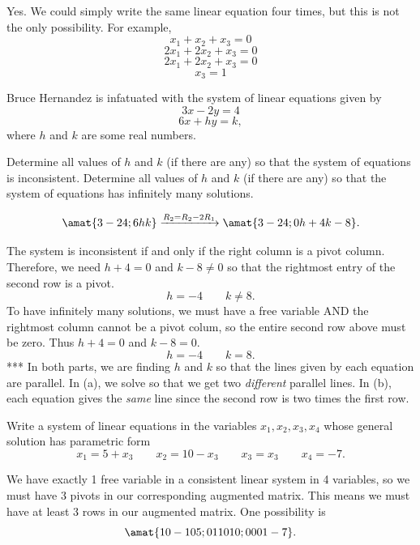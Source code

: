 \begin{problems}
\begin{solution}
  Yes.  We could simply write the same linear equation four times, but
  this is not the only possibility.  For example,
  \[x_1 + x_2 + x_3 = 0\]
  \[2x_1 + 2x_2 + x_3 = 0\]
  \[2x_1 + 2x_2 + x_3 = 0\]
  \[x_3 = 1\]
\end{solution}

\problem Bruce Hernandez is infatuated with the system of linear
equations given by
  \[3x - 2y = 4\]
  \[6x + h y = k,\] where $h$ and $k$ are some real numbers.

\begin{subproblems}
  \subproblem Determine all values of $h$ and $k$ (if there are any)
  so that the system of equations is inconsistent.%
  \subproblem Determine all values of $h$ and $k$ (if there are any)
  so that the system of equations has infinitely many solutions.
\end{subproblems}

\begin{solution}
  \[ \amat{3 -2 4; 6 h k} \xrightarrow[]{R_2=R_2-2R_1} \amat{3 -2 4; 0
      h+4 k-8}.\]
\begin{subproblems}
  \subproblem The system is inconsistent if and only if the right
  column is a pivot column.  Therefore, we need $h+4 = 0$ and
  $k-8 \neq 0$ so that the rightmost entry of the second row is a
  pivot.
  \[ h= -4 \qquad k \neq 8.\] %
  \subproblem To have infinitely many solutions, we must have a free
  variable AND the rightmost column cannot be a pivot colum, so the
  entire second row above must be zero.  Thus $h+4=0$ and $k-8=0$.
  \[h= -4 \qquad k = 8.\] %
  *** In both parts, we are finding $h$ and $k$ so that the lines
  given by each equation are parallel.  In (a), we solve so that we
  get two \textit{different} parallel lines.  In (b), each equation
  gives the \textit{same} line since the second row is two times the
  first row.
\end{subproblems}
\end{solution}

\problem %
Write a system of linear equations in the variables
$x_1, x_2, x_3, x_4$ whose general solution has parametric form
\[x_1 = 5 + x_3 \qquad
  x_2 = 10 - x_3 \qquad
  x_3 = x_3 \qquad
  x_4 = -7.
\]
\begin{solution}
  We have exactly 1 free variable in a consistent linear system in 4
  variables, so we must have 3 pivots in our corresponding augmented
  matrix.  This means we must have at least 3 rows in our augmented
  matrix.  One possibility is
  \[\amat{1 0 -1 0 5; 0 1 1 0 10; 0 0 0 1 -7}.\]  
\end{solution}


\end{problems}
